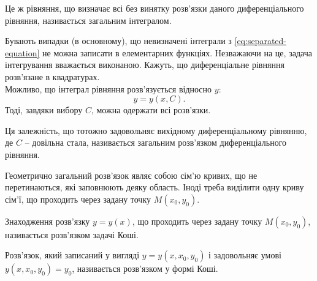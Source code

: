 \begin{definition}
	Це ж рівняння, що визначає всі без винятку розв’язки даного диференціального рівняння, називається загальним інтегралом.
\end{definition}

Бувають випадки (в основному), що невизначені інтеграли з \eqref{eq:separated-equation} не можна записати в елементарних функціях. Незважаючи на це, задача інтегрування вважається виконаною. Кажуть, що диференціальне рівняння розв’язане в квадратурах. \\

Можливо, що інтеграл рівняння розв’язується відносно $y$: 
\begin{equation*}
	y = y(x, C).
\end{equation*} Тоді, завдяки вибору $C$, можна одержати всі розв’язки. 

\begin{definition}
	Ця залежність, що тотожно задовольняє вихідному диференціальному рівнянню, де $C$ -- довільна стала, називається загальним розв’язком диференціального рівняння.
\end{definition}

Геометрично загальний розв’язок являє собою сім’ю кривих, що не перетинаються, які заповнюють деяку область. Іноді треба виділити одну криву сім’ї, що проходить через задану точку $M(x_0, y_0)$.

\begin{definition}
	Знаходження розв’язку $y = y(x)$, що проходить через задану точку $M(x_0, y_0)$, називається розв’язком задачі Коші.
\end{definition}

\begin{definition}
	Розв’язок, який записаний у вигляді $y = y(x, x_0, y_0)$ і задовольняє умові $y(x, x_0, y_0) = y_0$, називається розв’язком у формі Коші.
\end{definition}